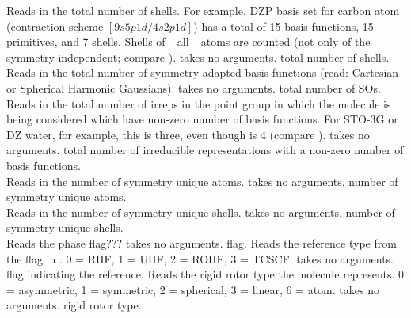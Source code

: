 {Reads in the total number of shells. For example, DZP basis set for 
carbon atom (contraction scheme $[9s5p1d/4s2p1d]$) has a total of 15 basis 
functions, 15 primitives, and 7 shells. Shells of \_all\_ atoms are counted
(not only of the symmetry independent; compare ).}
{takes no arguments.}
{total number of shells.} \\
{Reads in the total number of symmetry-adapted basis functions (read:
Cartesian or Spherical Harmonic Gaussians).}
{takes no arguments.}
{total number of SOs.} \\
{Reads in the total number of irreps
in the point group in which the molecule is being considered which
have non-zero number of basis functions. For STO-3G or DZ water, for
example, this is three, even though  is 4 (compare
).}
{takes no arguments.}
{total number of irreducible representations
with a non-zero number of basis functions.} \\
{Reads in the number of symmetry unique atoms.}
{takes no arguments.}
{number of symmetry unique atoms.} \\
{Reads in the number of symmetry unique shells.}
{takes no arguments.}
{number of symmetry unique shells.} \\
{Reads the phase flag???}
{takes no arguments.}
{flag.}
{Reads the reference type from the flag in .
0 = RHF, 1 = UHF, 2 = ROHF, 3 = TCSCF.}
{takes no arguments.}
{flag indicating the reference.}
{Reads the rigid rotor type the molecule represents.
0 = asymmetric, 1 = symmetric, 2 = spherical, 3 = linear, 6 = atom.}
{takes no arguments.}
{rigid rotor type.}

